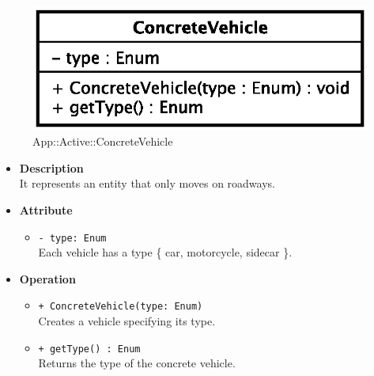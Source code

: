 \begin{figure}[h]
\centering
\includegraphics[scale=0.6,keepaspectratio]{images/solution/concrete_vehicle.eps}
\caption{App::Active::ConcreteVehicle}
\label{fig:sd-app-concrete-vehicle}
\end{figure}
\FloatBarrier
\begin{itemize}
  \item \textbf{Description} \\
It represents an entity that only moves on roadways.
  \item \textbf{Attribute}
  \begin{itemize}
    \item \texttt{- type: Enum} \\
Each vehicle has a type \{ car, motorcycle, sidecar \}.
  \end{itemize}
  \item \textbf{Operation}
  \begin{itemize} 
    \item \texttt{+ ConcreteVehicle(type: Enum)} \\
Creates a vehicle specifying its type.
    \item \texttt{+ getType() : Enum} \\
Returns the type of the concrete vehicle.
  \end{itemize}
\end{itemize} 
